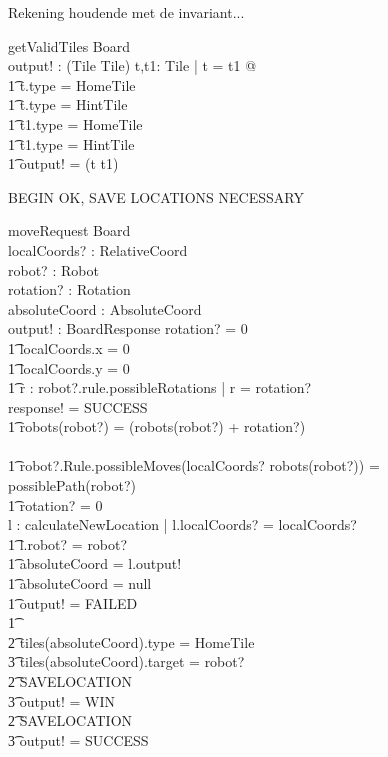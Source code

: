 \documentclass[a4paper,11pt]{article}
\begin{document}
Rekening houdende met de invariant...
\begin{schema}{getValidTiles}
\Xi Board \\
output! : (Tile \cross Tile)
\where
\exists t,t1: Tile | t \not = t1  @ \\ \t1 
t.type \not = HomeTile \\ \t1
t.type \not = HintTile \\ \t1
t1.type \not = HomeTile \\ \t1
t1.type \not = HintTile \implies \\ \t1
output! = (t \cross t1)
\end{schema}

BEGIN OK, SAVE LOCATIONS NECESSARY
\begin{schema}{moveRequest}
\Delta Board \\
localCoords? : RelativeCoord \\
robot? : Robot \\
rotation? : Rotation \\
absoluteCoord : AbsoluteCoord \\
output! : BoardResponse
\where
\IF rotation? \not = 0 \\ \t1
localCoords.x = 0 \\ \t1
localCoords.y = 0 \\ \t1
 \exists r : robot?.rule.possibleRotations | r = rotation?\\
\THEN response! = SUCCESS \\ \t1
robots(robot?) = (robots(robot?) + rotation?)  \\
\ELSE \\ \t1
\IF robot?.Rule.possibleMoves(localCoords? \cross robots(robot?)) = possiblePath(robot?) \\ \t1
rotation? = 0 \\
\THEN \exists l : calculateNewLocation | l.localCoords? = localCoords? \\ \t1
l.robot? = robot? \\ \t1
absoluteCoord = l.output! \\ \t1
\IF absoluteCoord = null \\ \t1
\THEN output! = FAILED \\ \t1
\ELSE \\ \t2
\IF tiles(absoluteCoord).type = HomeTile \\ \t3
tiles(absoluteCoord).target = robot? \\ \t2
\THEN SAVELOCATION \\ \t3
output! = WIN \\ \t2
\ELSE SAVELOCATION \\ \t3
output! = SUCCESS
\end{schema}
\end{document}
